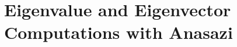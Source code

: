 % 
% 
% 
%   
%   
% 
% 

\chapter{Eigenvalue and Eigenvector Computations with Anasazi}
\label{chap:anasazi}


